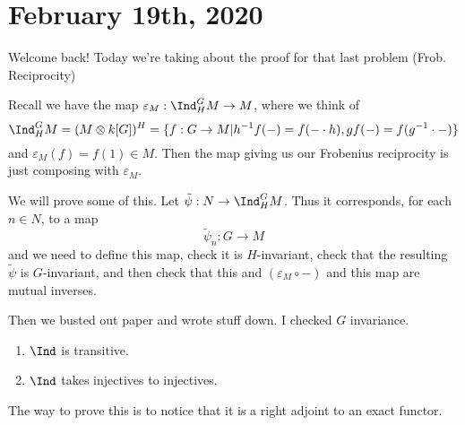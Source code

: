 \documentclass[12pt]{article}
\begin{document}
\section{February 19th, 2020}
Welcome back! Today we're taking about the proof for that last problem (Frob. Reciprocity)
\begin{prf}
	Recall we have the map $\varepsilon_M:\Ind_H^G M\to M$, where we think of 
	\[\Ind_H^G M=(M\otimes k[G])^H=\{f:G\to M|h^{-1}f(-)=f(-\cdot h), gf(-)=f(g^{-1}\cdot -)\}\]
	and $\varepsilon_M(f)=f(1)\in M$. Then the map giving us our Frobenius reciprocity is just composing with $\varepsilon_M$.

	We will prove some of this. Let $\tilde\psi:N\to \Ind_H^G M$. Thus it corresponds, for each $n\in N$, to a map 
	\[\tilde\psi_n:G\to M\]
	and we need to define this map, check it is $H$-invariant, check that the resulting $\tilde\psi$ is $G$-invariant, and then check that this and $(\varepsilon_M\circ -)$ and this map are mutual inverses.

	Then we busted out paper and wrote stuff down. I checked $G$ invariance.
\end{prf}
\begin{cor}
	\begin{enumerate}
		\item $\Ind$ is transitive.
		\item $\Ind$ takes injectives to injectives.
	\end{enumerate}
\end{cor}
The way to prove this is to notice that it is a right adjoint to an exact functor.
\end{document}
